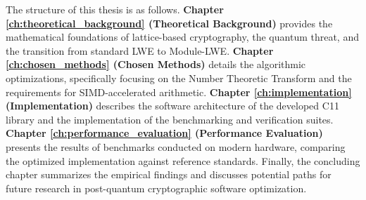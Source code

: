 The structure of this thesis is as follows. \textbf{Chapter \ref{ch:theoretical_background} (Theoretical Background)} provides the mathematical foundations of lattice-based cryptography, the quantum threat, and the transition from standard LWE to Module-LWE. \textbf{Chapter \ref{ch:chosen_methods} (Chosen Methods)} details the algorithmic optimizations, specifically focusing on the Number Theoretic Transform and the requirements for SIMD-accelerated arithmetic. \textbf{Chapter \ref{ch:implementation} (Implementation)} describes the software architecture of the developed C11 library and the implementation of the benchmarking and verification suites. \textbf{Chapter \ref{ch:performance_evaluation} (Performance Evaluation)} presents the results of benchmarks conducted on modern hardware, comparing the optimized implementation against reference standards. Finally, the concluding chapter summarizes the empirical findings and discusses potential paths for future research in post-quantum cryptographic software optimization.
